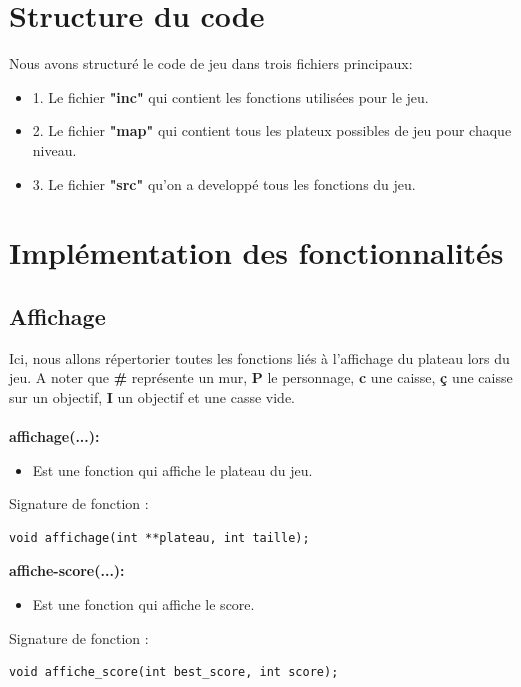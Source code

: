 \documentclass{article}
\begin{document}
\section{Structure du code}
Nous avons structuré le code de jeu dans trois fichiers principaux:
\begin{itemize}
    \item 1. Le fichier \textbf{"inc"} qui contient les fonctions utilisées pour le jeu.
    \item 2. Le fichier \textbf{"map"} qui contient tous les plateux possibles de jeu pour chaque niveau.
    \item 3. Le fichier \textbf{"src"} qu'on a developpé tous les fonctions du jeu. 
\end{itemize}
\section{Implémentation des fonctionnalités}
\subsection{Affichage}

Ici, nous allons répertorier toutes les fonctions liés à l'affichage du plateau lors du jeu. A noter que \textbf{\#} représente un mur, \textbf{P} le personnage, \textbf{c} une caisse, \textbf{ç} une caisse sur un objectif, \textbf{I} un objectif et \textbf{ } une casse vide.\\\\

\textbf{affichage(...):}
\begin{itemize}
\item Est une fonction qui affiche le plateau du jeu.
\end{itemize}

Signature de fonction :
\begin{lstlisting}
void affichage(int **plateau, int taille);
\end{lstlisting}

\textbf{affiche-score(...):}
\begin{itemize}
\item Est une fonction qui affiche le score.
\end{itemize}
Signature de fonction :
\begin{lstlisting}
void affiche_score(int best_score, int score);
\end{lstlisting}
\newpage
\end{document}
